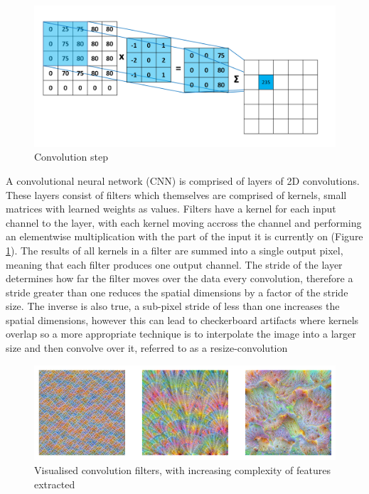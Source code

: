 \documentclass[twocolumn]{article}
\begin{document}
\begin{figure}[htbp]
\centering
\includegraphics[width=.9\linewidth]{images/convolution.png}
\caption{\label{fig:convolution}Convolution step\autocite{ConvolutionalNeuralNetworks}}
\end{figure}

A convolutional neural network (CNN) is comprised of layers of 2D convolutions.
These layers consist of filters which themselves are comprised of kernels, small matrices with learned weights as values\autocite{osheaIntroductionConvolutionalNeural2015}.
Filters have a kernel for each input channel to the layer, with each kernel moving accross the channel and performing an elementwise multiplication with the part of the input it is currently on (Figure \ref{fig:convolution}).
The results of all kernels in a filter are summed into a single output pixel, meaning that each filter produces one output channel.
The stride of the layer determines how far the filter moves over the data every convolution, therefore a stride greater than one reduces the spatial dimensions by a factor of the stride size\autocite{dumoulinGuideConvolutionArithmetic2018}.
The inverse is also true, a sub-pixel stride of less than one increases the spatial dimensions, however this can lead to checkerboard artifacts where kernels overlap so a more appropriate technique is to interpolate the image into a larger size and then convolve over it, referred to as a resize-convolution\autocite{odenaDeconvolutionCheckerboardArtifacts2016}\autocite{aitkenCheckerboardArtifactFree2017}

\begin{figure}[htbp]
\centering
\includegraphics[width=.9\linewidth]{images/convolution_filter.png}
\caption{\label{fig:convolution_filter}Visualised convolution filters, with increasing complexity of features extracted\autocite{graetzHowVisualizeConvolutional2019}}
\end{figure}
\end{document}
